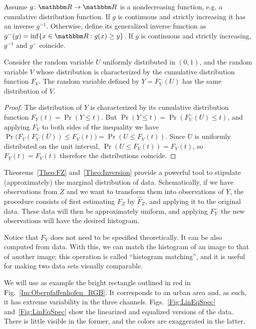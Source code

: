 Assume $g\colon \mathbbm R \to \mathbbm R$ is a nondecreasing function, e.g. a cumulative distribution function.
If $g$ is continuous and strictly increasing it has an inverse $g^{-1}$.
Otherwise, define its generalized inverse function as $g^- (y) = \inf\{ x \in \mathbbm R : g(x)\geq y\}$.
If $g$ is continuous and strictly increasing, $g^{-1}$ and $g^-$ coincide.

\begin{theorem}\label{Theo:Inversion}
Consider the random variable $U$ uniformly distributed in $(0,1)$, and the random variable $V$ whose distribution is characterized by the cumulative distribution function $F_V$.
The random variable defined by $Y=F^-_V(U)$ has the same distribution of $V$.
\end{theorem}

\begin{proof}
The distribution of $Y$ is characterized by its cumulative distribution function $F_Y(t) = \Pr(Y \leq t)$.
But $\Pr(Y \leq t) = \Pr(F^-_V(U) \leq t)$, and applying $F_V$ to both sides of the inequality we have
$ \Pr\big(F_V(F^-_V(U)) \leq F_V(t)\big) = \Pr(U \leq F_V(t))$.
Since $U$ is uniformly distributed on the unit interval, $\Pr(U \leq F_V(t)) = F_V(t)$, so $F_Y(t) = F_V(t)$ therefore the distributions coincide.
\end{proof}

Theorems~\ref{Theo:FZ} and~\ref{Theo:Inversion} provide a powerful tool to stipulate (approximately) the marginal distribution of data.
Schematically, if we have observations from $Z$ and we want to transform them into observations of $Y$, the procedure consists of first estimating $F_Z$ by $\widehat F_Z$, and applying it to the original data.
These data will then be approximately uniform, and applying $F_Y^-$ the new observations will have the desired histogram.

Notice that $F_Y$ does not need to be specified theoretically.
It can be also computed from data.
With this, we can match the histogram of an image to that of another image;
this operation is called ``histogram matching'', and it is useful for making two data sets visually comparable.

We will use as example the bright rectangle outlined in red in Fig.~\ref{Im:Oberpfaffenhofen_RGB}.
It corresponds to an urban area and, as such, it has extreme variability in the three channels.
Figs.~\ref{Fig:LinEqSpec} and~\ref{Fig:LinEqSpec} show the linearized and equalized versions of the data.
There is little visible in the former, and the colors are exaggerated in the latter.

